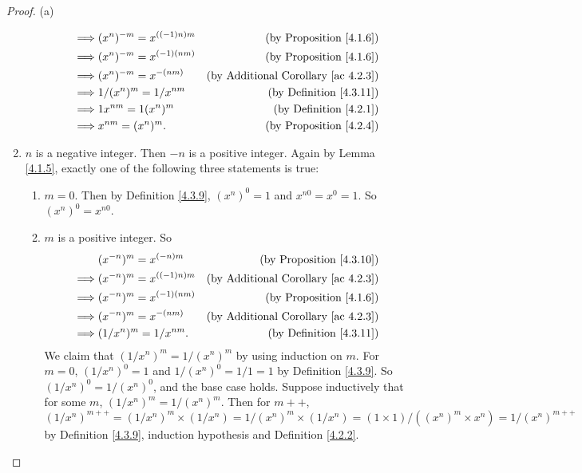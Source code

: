 \begin{proof}{(a)}
\begin{enumerate}[label=(\Roman*)]
\begin{enumerate}[label=(\roman*)]
\begin{align*}
        \implies & (x^n)^{-m} = x^{((-1)n)m} & \text{(by Proposition \ref{4.1.6})} \\
        \implies & (x^n)^{-m} = x^{(-1)(nm)} & \text{(by Proposition \ref{4.1.6})} \\
        \implies & (x^n)^{-m} = x^{-(nm)} & \text{(by Additional Corollary \ref{ac 4.2.3})} \\
        \implies & 1 / (x^n)^m = 1 / x^{nm} & \text{(by Definition \ref{4.3.11})} \\
        \implies & 1x^{nm} = 1(x^n)^m  & \text{(by Definition \ref{4.2.1})} \\
        \implies & x^{nm} = (x^n)^m.  & \text{(by Proposition \ref{4.2.4})}
        \end{align*}
    \end{enumerate}
    \item \(n\) is a negative integer.
    Then \(-n\) is a positive integer.
    Again by Lemma \ref{4.1.5}, exactly one of the following three statements is true:
    \begin{enumerate}[label=(\roman*)]
        \item \(m = 0\).
        Then by Definition \ref{4.3.9}, \((x^n)^0 = 1\) and \(x^{n0} = x^0 = 1\).
        So \((x^n)^0 = x^{n0}\).
        \item \(m\) is a positive integer.
        So
        \begin{align*}
        & (x^{-n})^m = x^{(-n)m} & \text{(by Proposition \ref{4.3.10})} \\
        \implies & (x^{-n})^m = x^{((-1)n)m} & \text{(by Additional Corollary \ref{ac 4.2.3})} \\
        \implies & (x^{-n})^m = x^{(-1)(nm)} & \text{(by Proposition \ref{4.1.6})} \\
        \implies & (x^{-n})^m = x^{-(nm)} & \text{(by Additional Corollary \ref{ac 4.2.3})} \\
        \implies & (1 / x^n)^m = 1 / x^{nm}. & \text{(by Definition \ref{4.3.11})}
        \end{align*}
        We claim that \((1 / x^n)^m = 1 / (x^n)^m\) by using induction on \(m\).
        For \(m = 0\), \((1 / x^n)^0 = 1\) and \(1 / (x^n)^0 = 1 / 1 = 1\) by Definition \ref{4.3.9}.
        So \((1 / x^n)^0 = 1 / (x^n)^0\), and the base case holds.
        Suppose inductively that for some \(m\), \((1 / x^n)^m = 1 / (x^n)^m\).
        Then for \(m++\), \((1 / x^n)^{m++} = (1 / x^n)^m \times (1 / x^n) = 1 / (x^n)^m \times (1 / x^n) = (1 \times 1) / ((x^n)^m \times x^n) = 1 / (x^n)^{m++}\) by Definition \ref{4.3.9}, induction hypothesis and Definition \ref{4.2.2}.

\end{enumerate}
\end{enumerate}
\end{proof}
